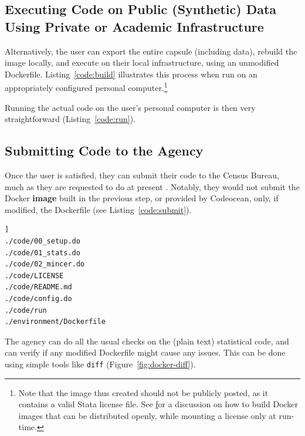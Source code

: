 \documentclass[inline]{hdsr}
\begin{document}
\subsection{Executing Code on Public (Synthetic) Data Using Private or Academic Infrastructure}

Alternatively, the user can export the entire capsule (including data), rebuild the image locally, and execute on their local infrastructure, using an unmodified Dockerfile. Listing~\ref{code:build} illustrates this process when run on an appropriately configured personal computer.\footnote{Note that the image thus created should not be publicly posted, as it contains a valid Stata license file. See \href{https://github.com/AEADataEditor/docker-stata} for a discussion on how to build Docker images that can be distributed openly, while mounting a license only at run-time.}


%

\noindent Running the actual code on the user's personal computer is then very straightforward (Listing~\ref{code:run}).






\subsection{Submitting Code to the Agency}

Once the user is satisfied, they can submit their code to the Census Bureau, much as they are requested to do at present \citep{u.s.censusbureauSIPPSyntheticBeta2015b}. Notably, they would not submit the Docker \textbf{image} built in the previous step, or provided by Codeocean, only, if modified, the Dockerfile (see Listing~\ref{code:submit}).

\begin{lstlisting}[language=bash, caption=Submitted files,basicstyle=\footnotesize\color{NavyBlue}\ttfamily,label={code:submit}]]
./code/00_setup.do
./code/01_stats.do
./code/02_mincer.do
./code/LICENSE
./code/README.md
./code/config.do
./code/run
./environment/Dockerfile
\end{lstlisting}


The agency can do all the usual checks on the (plain text) statistical code, and can verify if any modified Dockerfile might cause any issues. This can be done using simple tools like \texttt{diff} (Figure~\ref{fig:docker-diff}).
\end{document}

